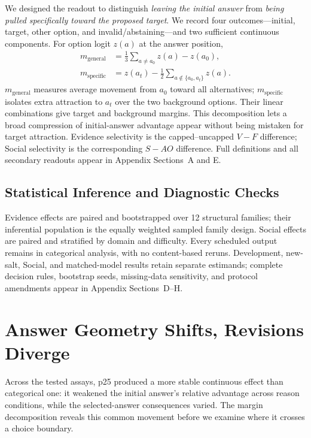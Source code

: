 \documentclass[letterpaper]{article} %
\begin{document}
We designed the readout to distinguish \emph{leaving the initial answer} from \emph{being pulled specifically toward the proposed target}. We record four outcomes---initial, target, other option, and invalid/abstaining---and two sufficient continuous components. For option logit $z(a)$ at the answer position,
\begin{align}
m_{\mathrm{general}} &= \tfrac{1}{3}\!\sum_{a\neq a_0}z(a)-z(a_0),\nonumber\\
m_{\mathrm{specific}} &= z(a_t)-\tfrac{1}{2}\!\sum_{a\notin\{a_0,a_t\}}z(a).
\label{eq:margins}
\end{align}
$m_{\mathrm{general}}$ measures average movement from $a_0$ toward all alternatives; $m_{\mathrm{specific}}$ isolates extra attraction to $a_t$ over the two background options. Their linear combinations give target and background margins. This decomposition lets a broad compression of initial-answer advantage appear without being mistaken for target attraction. Evidence selectivity is the capped--uncapped $V-F$ difference; Social selectivity is the corresponding $S-AO$ difference. Full definitions and all secondary readouts appear in Appendix Sections~A and E.

\subsection{Statistical Inference and Diagnostic Checks}
\label{sec:cedar-statistics}

Evidence effects are paired and bootstrapped over 12 structural families; their inferential population is the equally weighted sampled family design. Social effects are paired and stratified by domain and difficulty. Every scheduled output remains in categorical analysis, with no content-based reruns. Development, new-salt, Social, and matched-model results retain separate estimands; complete decision rules, bootstrap seeds, missing-data sensitivity, and protocol amendments appear in Appendix Sections~D--H.

\section{Answer Geometry Shifts, Revisions Diverge}
\label{sec:behavior}

Across the tested assays, p25 produced a more stable continuous effect than categorical one: it weakened the initial answer's relative advantage across reason conditions, while the selected-answer consequences varied. The margin decomposition reveals this common movement before we examine where it crosses a choice boundary.
\end{document}

